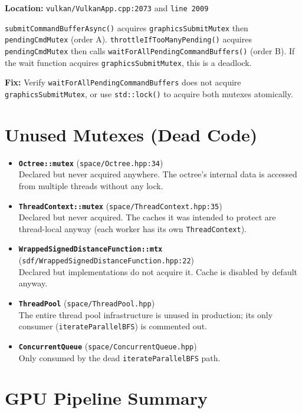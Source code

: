 \documentclass[a4paper,11pt]{article}
\begin{document}
\textbf{Location:}
\texttt{vulkan/VulkanApp.cpp:2073} and \texttt{line~2009}

\texttt{submitCommandBufferAsync()} acquires \texttt{graphicsSubmitMutex}
then \texttt{pendingCmdMutex} (order A). \texttt{throttleIfTooManyPending()}
acquires \texttt{pendingCmdMutex} then calls
\texttt{waitForAllPendingCommandBuffers()} (order B). If the wait function
acquires \texttt{graphicsSubmitMutex}, this is a deadlock.

\textbf{Fix:} Verify \texttt{waitForAllPendingCommandBuffers} does not
acquire \texttt{graphicsSubmitMutex}, or use \texttt{std::lock()} to acquire
both mutexes atomically.

\section{Unused Mutexes (Dead Code)}

\begin{itemize}
\item \textbf{\texttt{Octree::mutex}} (\texttt{space/Octree.hpp:34})\\
      Declared but never acquired anywhere. The octree's internal data is
      accessed from multiple threads without any lock.
\item \textbf{\texttt{ThreadContext::mutex}} (\texttt{space/ThreadContext.hpp:35})\\
      Declared but never acquired. The caches it was intended to protect
      are thread-local anyway (each worker has its own \texttt{ThreadContext}).
\item \textbf{\texttt{WrappedSignedDistanceFunction::mtx}}
      (\texttt{sdf/WrappedSignedDistanceFunction.hpp:22})\\
      Declared but implementations do not acquire it. Cache is disabled by
      default anyway.
\item \textbf{\texttt{ThreadPool}} (\texttt{space/ThreadPool.hpp})\\
      The entire thread pool infrastructure is unused in production; its
      only consumer (\texttt{iterateParallelBFS}) is commented out.
\item \textbf{\texttt{ConcurrentQueue}} (\texttt{space/ConcurrentQueue.hpp})\\
      Only consumed by the dead \texttt{iterateParallelBFS} path.
\end{itemize}

\section{GPU Pipeline Summary}
\end{document}
